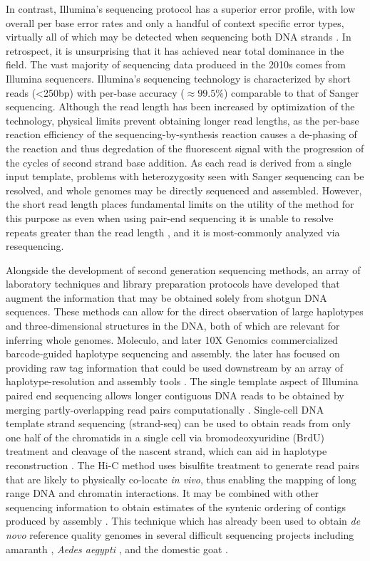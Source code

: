 In contrast, Illumina's sequencing protocol has a superior error profile, with low overall per base error rates and only a handful of context specific error types, virtually all of which may be detected when sequencing both DNA strands \cite{allhoff2013discovering}.
In retrospect, it is unsurprising that it has achieved near total dominance in the field.
The vast majority of sequencing data produced in the 2010s comes from Illumina sequencers.
Illumina's sequencing technology is characterized by short reads (<250bp) with per-base accuracy ($\approx 99.5\%$) comparable to that of Sanger sequencing.
Although the read length has been increased by optimization of the technology, physical limits prevent obtaining longer read lengths, as the per-base reaction efficiency of the sequencing-by-synthesis reaction causes a de-phasing of the reaction and thus degredation of the fluorescent signal with the progression of the cycles of second strand base addition.
As each read is derived from a single input template, problems with heterozygosity seen with Sanger sequencing can be resolved, and whole genomes may be directly sequenced and assembled.
However, the short read length places fundamental limits on the utility of the method for this purpose as even when using pair-end sequencing it is unable to resolve repeats greater than the read length \cite{alkan2010limitations}, and it is most-commonly analyzed via resequencing.

Alongside the development of second generation sequencing methods, an array of laboratory techniques and library preparation protocols have developed that augment the information that may be obtained solely from shotgun DNA sequences.
These methods can allow for the direct observation of large haplotypes and three-dimensional structures in the DNA, both of which are relevant for inferring whole genomes.
Moleculo, and later 10X Genomics commercialized barcode-guided haplotype sequencing and assembly.
the later has focused on providing raw tag information that could be used downstream by an array of haplotype-resolution and assembly tools \cite{mostovoy2016hybrid}.
The single template aspect of Illumina paired end sequencing allows longer contiguous DNA reads to be obtained by merging partly-overlapping read pairs computationally \cite{magovc2011flash}.
Single-cell DNA template strand sequencing (strand-seq) can be used to obtain reads from only one half of the chromatids in a single cell \cite{falconer2012dna} via bromodeoxyuridine (BrdU) treatment and cleavage of the nascent strand, which can aid in haplotype reconstruction \cite{porubsky2016direct}.
The Hi-C method \cite{lieberman2009comprehensive} uses bisulfite treatment to generate read pairs that are likely to physically co-locate \emph{in vivo}, thus enabling the mapping of long range DNA and chromatin interactions.
It may be combined with other sequencing information to obtain estimates of the syntenic ordering of contigs produced by assembly \cite{ghurye2018integrating}.
This technique which has already been used to obtain \emph{de novo} reference quality genomes in several difficult sequencing projects including amaranth \cite{lightfoot2017single}, \emph{Aedes aegypti} \cite{dudchenko2017novo}, and the domestic goat \cite{bickhart2017single}.

